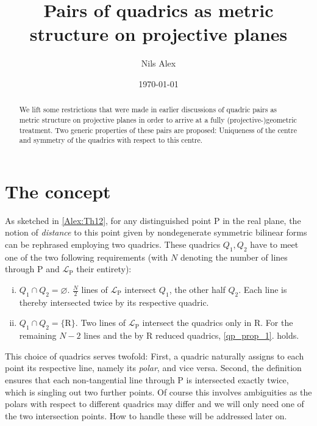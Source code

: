 \documentclass[12pt,english,paper=a4,DIV=12,headings=small,numbers=noenddot,parskip=half]{scrartcl}
\theoremstyle{definition}
\begin{document}
\title{Pairs of quadrics as metric structure on projective planes}
\author{Nils Alex}
\date{\today}

\maketitle

\begin{abstract}
We lift some restrictions that were made in earlier discussions of quadric pairs as metric structure on projective planes in order to arrive at a fully (projective-)geometric treatment. Two generic properties of these pairs are proposed: Uniqueness of the centre and symmetry of the quadrics with respect to this centre.
\end{abstract}

\section{The concept}

As sketched in \ref{Alex:Th12}, for any distinguished point $\mathrm{P}$ in the real plane, the notion of \emph{distance} to this point given by nondegenerate symmetric bilinear forms can be rephrased employing two quadrics. These quadrics $Q_1, Q_2$ have to meet one of the two following requirements (with $N$ denoting the number of lines through $\mathrm{P}$ and $\mathscr{L}_\mathrm{P}$ their entirety):
\begin{enumerate}[i.]
\item{$Q_1 \cap Q_2 = \varnothing$. $\frac{N}{2}$ lines of $\mathscr{L}_\mathrm{P}$ intersect $Q_1$, the other half $Q_2$. Each line is thereby intersected twice by its respective quadric.\label{qp_prop_1}} 
\item{$Q_1 \cap Q_2 = \{ \mathrm{R} \}$. Two lines of $\mathscr{L}_\mathrm{P}$ intersect the quadrics only in $\mathrm{R}$. For the remaining $N-2$ lines and the by $\mathrm{R}$ reduced quadrics, \ref{qp_prop_1}. holds.}
\end{enumerate}

This choice of quadrics serves twofold: First, a quadric naturally assigns to each point its respective line, namely its \emph{polar}, and vice versa. Second, the definition ensures that each non-tangential line through $\mathrm{P}$ is intersected exactly twice, which is singling out two further points. Of course this involves ambiguities as the polars with respect to different quadrics may differ and we will only need one of the two intersection points. How to handle these will be addressed later on.
\end{document}
